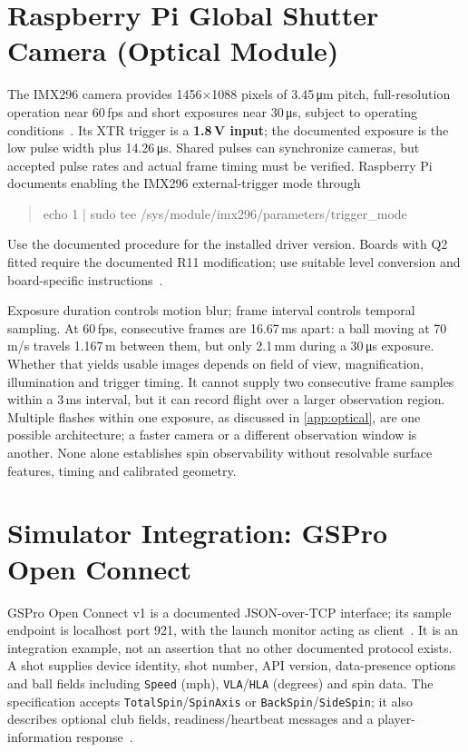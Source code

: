 \section{Raspberry Pi Global Shutter Camera (Optical Module)}

The IMX296 camera provides 1456$\times$1088 pixels of 3.45\,\si{\micro\meter} pitch, full-resolution operation near 60\,fps and short exposures near 30\,\si{\micro\second}, subject to operating conditions~\cite{pigsproduct}.
Its XTR trigger is a \textbf{1.8\,V input}; the documented exposure is the low pulse width plus 14.26\,\si{\micro\second}.
Shared pulses can synchronize cameras, but accepted pulse rates and actual frame timing must be verified.
Raspberry Pi documents enabling the IMX296 external-trigger mode through
\begin{quote}\small\ttfamily
 echo 1 | sudo tee /sys/module/imx296/parameters/trigger\_mode
\end{quote}
Use the documented procedure for the installed driver version.
Boards with Q2 fitted require the documented R11 modification; use suitable level conversion and board-specific instructions~\cite{pigscam}.

Exposure duration controls motion blur; frame interval controls temporal sampling.
At 60\,fps, consecutive frames are 16.67\,ms apart: a ball moving at 70\,m/s travels 1.167\,m between them, but only 2.1\,mm during a 30\,\si{\micro\second} exposure.
Whether that yields usable images depends on field of view, magnification, illumination and trigger timing.
It cannot supply two consecutive frame samples within a 3\,ms interval, but it can record flight over a larger observation region.
Multiple flashes within one exposure, as discussed in \cref{app:optical}, are one possible architecture; a faster camera or a different observation window is another.
None alone establishes spin observability without resolvable surface features, timing and calibrated geometry.

\section{Simulator Integration: GSPro Open Connect}
\label{app:gspro}

GSPro Open Connect v1 is a documented JSON-over-TCP interface; its sample endpoint is localhost port 921, with the launch monitor acting as client~\cite{gspro}.
It is an integration example, not an assertion that no other documented protocol exists.
A shot supplies device identity, shot number, API version, data-presence options and ball fields including \texttt{Speed} (mph), \texttt{VLA}/\texttt{HLA} (degrees) and spin data.
The specification accepts \texttt{TotalSpin}/\texttt{SpinAxis} or \texttt{BackSpin}/\texttt{SideSpin}; it also describes optional club fields, readiness/heartbeat messages and a player-information response~\cite{gspro}.

